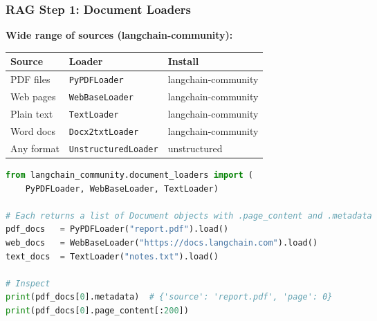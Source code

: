 \begin{frame}[fragile]\frametitle{RAG Step 1: Document Loaders}

\textbf{Wide range of sources (langchain-community):}
\begin{center}
\begin{tabular}{|l|l|l|}
\hline
\textbf{Source} & \textbf{Loader} & \textbf{Install} \\
\hline
PDF files & \texttt{PyPDFLoader} & langchain-community \\
Web pages & \texttt{WebBaseLoader} & langchain-community \\
Plain text & \texttt{TextLoader} & langchain-community \\
Word docs & \texttt{Docx2txtLoader} & langchain-community \\
Any format & \texttt{UnstructuredLoader} & unstructured \\
\hline
\end{tabular}
\end{center}

\begin{lstlisting}[language=python,basicstyle=\tiny]
from langchain_community.document_loaders import (
    PyPDFLoader, WebBaseLoader, TextLoader)

# Each returns a list of Document objects with .page_content and .metadata
pdf_docs   = PyPDFLoader("report.pdf").load()
web_docs   = WebBaseLoader("https://docs.langchain.com").load()
text_docs  = TextLoader("notes.txt").load()

# Inspect
print(pdf_docs[0].metadata)  # {'source': 'report.pdf', 'page': 0}
print(pdf_docs[0].page_content[:200])
\end{lstlisting}

\end{frame}

